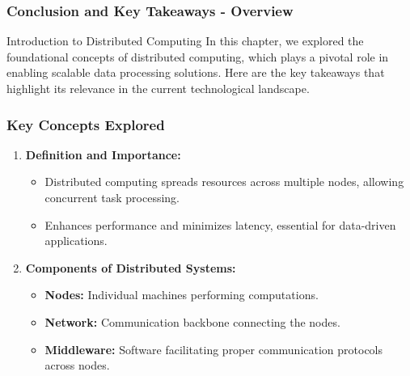 \documentclass[aspectratio=169]{beamer}
\begin{document}
\begin{frame}[fragile]
  \frametitle{Conclusion and Key Takeaways - Overview}
  \begin{block}{Introduction to Distributed Computing}
    In this chapter, we explored the foundational concepts of distributed computing, which plays a pivotal role in enabling scalable data processing solutions. 
    Here are the key takeaways that highlight its relevance in the current technological landscape.
  \end{block}
\end{frame}

\begin{frame}[fragile]
  \frametitle{Key Concepts Explored}
  \begin{enumerate}
    \item \textbf{Definition and Importance:}
      \begin{itemize}
        \item Distributed computing spreads resources across multiple nodes, allowing concurrent task processing.
        \item Enhances performance and minimizes latency, essential for data-driven applications.
      \end{itemize}
    
    \item \textbf{Components of Distributed Systems:}
      \begin{itemize}
        \item \textbf{Nodes:} Individual machines performing computations.
        \item \textbf{Network:} Communication backbone connecting the nodes.
        \item \textbf{Middleware:} Software facilitating proper communication protocols across nodes.
      \end{itemize}
  \end{enumerate}
\end{frame}
\end{document}
